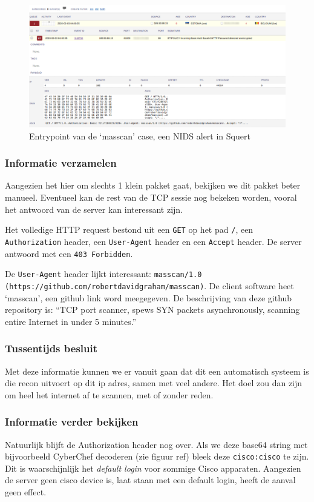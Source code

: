 \documentclass[a4paper,12pt]{report}
\begin{document}
\begin{figure}[H]
  \centering
  \includegraphics[width=\textwidth]{analyse-masscan-entrypoint}
  \caption{Entrypoint van de `masscan' case, een NIDS alert in Squert}
  \label{fig:analyse-masscan-entrypoint}
\end{figure}


\subsubsection{Informatie verzamelen}
Aangezien het hier om slechts 1 klein pakket gaat, bekijken we dit pakket beter manueel.
Eventueel kan de rest van de TCP sessie nog bekeken worden, vooral het antwoord van de server kan interessant zijn.

Het volledige HTTP request bestond uit een \lstinline|GET| op het pad \lstinline|/|, een \lstinline|Authorization| header, een \lstinline|User-Agent| header en een \lstinline|Accept| header.
De server antwoord met een \lstinline|403 Forbidden|.

De \lstinline|User-Agent| header lijkt interessant: \lstinline|masscan/1.0 (https://github.com/robertdavidgraham/masscan)|.
De client software heet `masscan', een github link word meegegeven.
De beschrijving van deze github repository is: ``TCP port scanner, spews SYN packets asynchronously, scanning entire Internet in under 5 minutes.''

\subsubsection{Tussentijds besluit}
Met deze informatie kunnen we er vanuit gaan dat dit een automatisch systeem is die recon uitvoert op dit ip adres, samen met veel andere.
Het doel zou dan zijn om heel het internet af te scannen, met of zonder reden.

\subsubsection{Informatie verder bekijken}
Natuurlijk blijft de Authorization header nog over.
Als we deze base64 string met bijvoorbeeld CyberChef decoderen (zie figuur ref) bleek deze \lstinline|cisco:cisco| te zijn.
Dit is waarschijnlijk het \emph{default login} voor sommige Cisco apparaten.
Aangezien de server geen cisco device is, laat staan met een default login, heeft de aanval geen effect.
\end{document}
